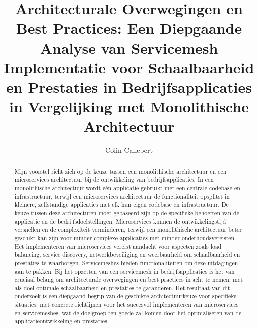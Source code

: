 \documentclass{hogent-article}
\title{Architecturale Overwegingen en Best Practices: Een Diepgaande Analyse van Servicemesh Implementatie voor Schaalbaarheid en Prestaties in Bedrijfsapplicaties in Vergelijking met Monolithische Architectuur}
\author{Colin Callebert}
\begin{document}
\begin{abstract}
  Mijn voorstel richt zich op de keuze tussen een monolithische architectuur en een microservices architectuur bij de ontwikkeling van bedrijfsapplicaties. In een monolithische architectuur wordt één applicatie gebruikt met een centrale codebase en infrastructuur, terwijl een microservices architectuur de functionaliteit opsplitst in kleinere, zelfstandige applicaties met elk hun eigen codebase en infrastructuur. De keuze tussen deze architecturen moet gebaseerd zijn op de specifieke behoeften van de applicatie en de bedrijfsdoelstellingen. Microservices kunnen de ontwikkelingstijd versnellen en de complexiteit verminderen, terwijl een monolithische architectuur beter geschikt kan zijn voor minder complexe applicaties met minder onderhoudsvereisten. Het implementeren van microservices vereist aandacht voor aspecten zoals load balancing, service discovery, netwerkbeveiliging en weerbaarheid om schaalbaarheid en prestaties te waarborgen. Servicemeshes bieden functionaliteiten om deze uitdagingen aan te pakken. Bij het opzetten van een servicemesh in bedrijfsapplicaties is het van cruciaal belang om architecturale overwegingen en best practices in acht te nemen, met als doel optimale schaalbaarheid en prestaties te garanderen. Het resultaat van dit onderzoek is een diepgaand begrip van de geschikte architectuurkeuze voor specifieke situaties, met concrete richtlijnen voor het succesvol implementeren van microservices en servicemeshes, wat de doelgroep ten goede zal komen door het optimaliseren van de applicatieontwikkeling en prestaties.
\end{abstract}

\tableofcontents



\printbibliography[heading=bibintoc]
\end{document}
